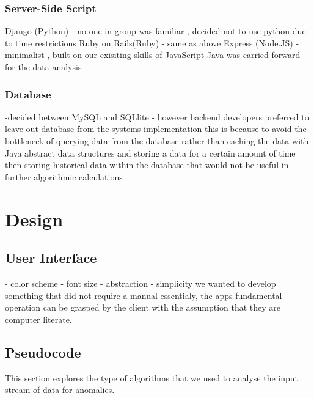 \documentclass[12pt]{article}
\begin{document}
    \subsubsection{Server-Side Script}
    Django (Python) - no one in group was familiar , decided not to use python due to time restrictions
    Ruby on Rails(Ruby) - same as above
    Express (Node.JS) - minimalist , built on our exisiting skills of JavaScript
    Java was carried forward for the data analysis
    \subsubsection{Database}
    -decided between MySQL and SQLlite
      - however backend developers preferred to leave out database from the systems implementation
      this is because to avoid the bottleneck of querying data from the database rather than
      caching the data with Java abstract data structures and storing a data for a certain amount
      of time then storing historical data within the database that would not be useful in further
      algorithmic calculations
\section{Design}
  \subsection{User Interface}
    - color scheme
    - font size
    - abstraction
      - simplicity
         we wanted to develop something that did not require a manual essentialy,
         the apps fundamental operation can be grasped by the client with the assumption
         that they are computer literate.
  \subsection{Pseudocode}
    This section explores the type of algorithms that we used to analyse the input stream of data for anomalies.
\end{document}
